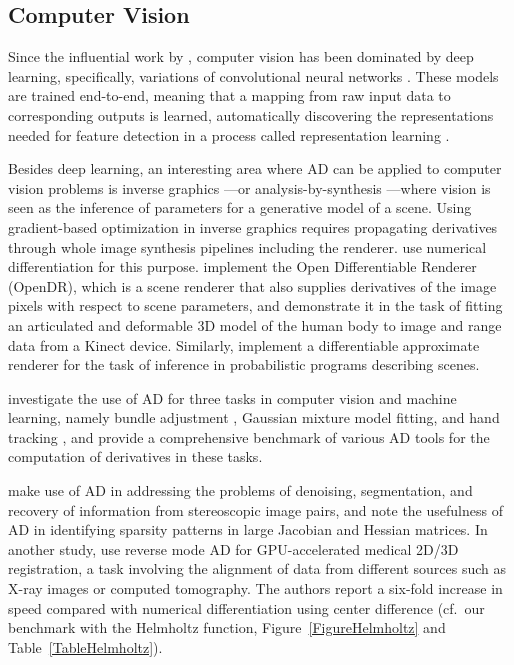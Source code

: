 \documentclass[twoside,11pt]{article}
\begin{document}
\subsection{Computer Vision}

Since the influential work by \citet{krizhevsky2012imagenet}, computer vision has been dominated by deep learning, specifically, variations of convolutional neural networks \citep{lecun1998gradient}. These models are trained end-to-end, meaning that a mapping from raw input data to corresponding outputs is learned, automatically discovering the representations needed for feature detection in a process called representation learning \citep{bengio2013representation}.

Besides deep learning, an interesting area where AD can be applied to computer vision problems is inverse graphics \citep{horn1977understanding,hinton1997generative}---or analysis-by-synthesis \citep{yildirim2015efficient}---where vision is seen as the inference of parameters for a generative model of a scene. Using gradient-based optimization in inverse graphics requires propagating derivatives through whole image synthesis pipelines including the renderer. \citet{eslami2016attend} use numerical differentiation for this purpose. \citet{loper2014opendr} implement the Open Differentiable Renderer (OpenDR), which is a scene renderer that also supplies derivatives of the image pixels with respect to scene parameters, and demonstrate it in the task of fitting an articulated and deformable 3D model of the human body to image and range data from a Kinect device. Similarly, \citet{kulkarni2015picture} implement a differentiable approximate renderer for the task of inference in probabilistic programs describing scenes.

\citet{srajer2016benchmark} investigate the use of AD for three tasks in computer vision and machine learning, namely bundle adjustment \citep{triggs1999bundle}, Gaussian mixture model fitting, and hand tracking \citep{taylor2014user}, and provide a comprehensive benchmark of various AD tools for the computation of derivatives in these tasks.

\citet{Pock2007} make use of AD in addressing the problems of denoising, segmentation, and recovery of information from stereoscopic image pairs, and note the usefulness of AD in identifying sparsity patterns in large Jacobian and Hessian matrices. In another study, \citet{Grabner2008} use reverse mode AD for GPU-accelerated medical 2D/3D registration, a task involving the alignment of data from different sources such as X-ray images or computed tomography. The authors report a six-fold increase in speed compared with numerical differentiation using center difference (cf.\ our benchmark with the Helmholtz function, Figure~\ref{FigureHelmholtz} and Table~\ref{TableHelmholtz}).
\end{document}
